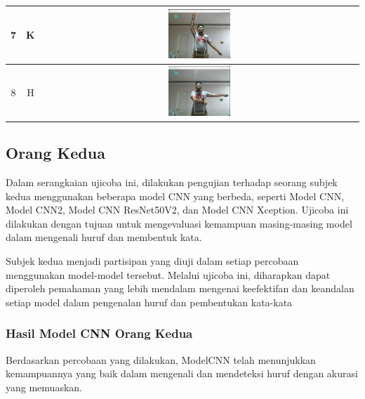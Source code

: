 \begin{table}[!hbt]
\begin{tabular}{|c|c|c|}
	\hline
	7 & K & \includegraphics[width=0.2\textwidth]{gambar/bener/HurufK_ModelCNNXception_Dawe.png} \\
	\hline
	8 & H & \includegraphics[width=0.2\textwidth]{gambar/bener/HurufH_ModelCNNXception_Dawe.png} \\
	\hline
	\end{tabular}
\end{table}


\subsection{Orang Kedua}

Dalam serangkaian ujicoba ini, dilakukan pengujian terhadap seorang subjek kedua menggunakan beberapa model CNN yang berbeda, seperti Model CNN, Model CNN2, Model CNN ResNet50V2, dan Model CNN Xception. Ujicoba ini dilakukan dengan tujuan untuk mengevaluasi kemampuan masing-masing model dalam mengenali huruf dan membentuk kata.

Subjek kedua menjadi partisipan yang diuji dalam setiap percobaan menggunakan model-model tersebut. Melalui ujicoba ini, diharapkan dapat diperoleh pemahaman yang lebih mendalam mengenai keefektifan dan keandalan setiap model dalam pengenalan huruf dan pembentukan kata-kata

\subsubsection*{Hasil Model CNN Orang Kedua}

Berdasarkan percobaan yang dilakukan, ModelCNN telah menunjukkan kemampuannya yang baik dalam mengenali dan mendeteksi huruf dengan akurasi yang memuaskan.

